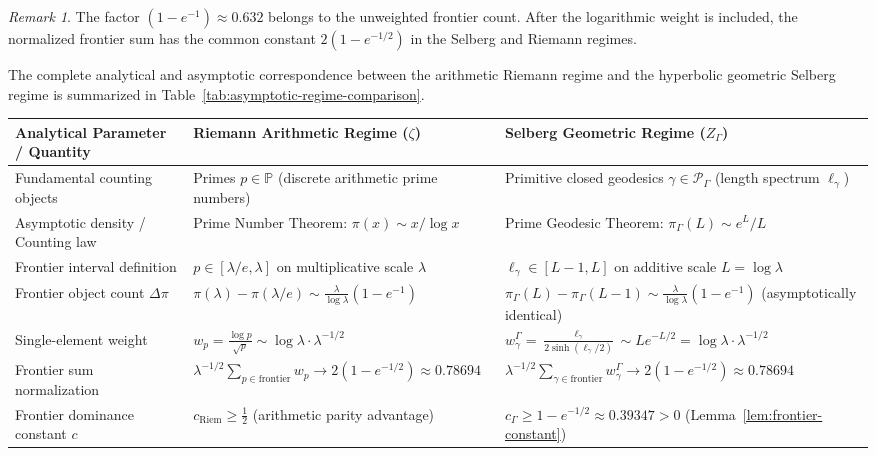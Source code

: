 \documentclass[12pt,a4paper]{article}
\theoremstyle{definition}
\theoremstyle{remark}
\newtheorem{remark}[theorem]{Remark}
\newcommand{\Sel}{Z_{\Gamma}}
\begin{document}
\begin{remark}
The factor $(1-e^{-1}) \approx 0.632$ belongs to the unweighted frontier
count.  After the logarithmic weight is included, the normalized frontier sum
has the common constant $2(1-e^{-1/2})$ in the Selberg and Riemann regimes.
\end{remark}

The complete analytical and asymptotic correspondence between the arithmetic
Riemann regime and the hyperbolic geometric Selberg regime is summarized in
Table~\ref{tab:asymptotic-regime-comparison}.

\begin{table}[htbp]
\centering
\footnotesize
\setlength{\tabcolsep}{4pt}
{\renewcommand{\arraystretch}{1.15}
\begin{tabularx}{\textwidth}{@{}L{3.2cm}YY@{}}
\toprule
\textbf{Analytical Parameter / Quantity} & \textbf{Riemann Arithmetic Regime ($\zeta$)} & \textbf{Selberg Geometric Regime ($\Sel$)} \\
\midrule
Fundamental counting objects
  & Primes $p \in \mathbb{P}$ (discrete arithmetic prime numbers)
  & Primitive closed geodesics $\gamma \in \mathcal{P}_\Gamma$ (length spectrum $\ell_\gamma$) \\[3pt]
Asymptotic density / Counting law
  & Prime Number Theorem: $\pi(x) \sim x / \log x$
  & Prime Geodesic Theorem: $\pi_\Gamma(L) \sim e^L / L$ \\[3pt]
Frontier interval definition
  & $p \in [\lambda/e, \lambda]$ on multiplicative scale $\lambda$
  & $\ell_\gamma \in [L-1, L]$ on additive scale $L = \log\lambda$ \\[3pt]
Frontier object count $\Delta \pi$
  & $\pi(\lambda) - \pi(\lambda/e) \sim \frac{\lambda}{\log\lambda}(1 - e^{-1})$
  & $\pi_\Gamma(L) - \pi_\Gamma(L-1) \sim \frac{\lambda}{\log\lambda}(1 - e^{-1})$ (asymptotically identical) \\[3pt]
Single-element weight
  & $w_p = \frac{\log p}{\sqrt{p}} \sim \log\lambda \cdot \lambda^{-1/2}$
  & $w^\Gamma_\gamma = \frac{\ell_\gamma}{2\sinh(\ell_\gamma/2)} \sim L e^{-L/2} = \log\lambda \cdot \lambda^{-1/2}$ \\[3pt]
Frontier sum normalization
  & $\lambda^{-1/2}\sum_{p \in \mathrm{frontier}} w_p \to 2(1-e^{-1/2}) \approx 0.78694$
  & $\lambda^{-1/2}\sum_{\gamma \in \mathrm{frontier}} w^\Gamma_\gamma \to 2(1-e^{-1/2}) \approx 0.78694$ \\[3pt]
Frontier dominance constant $c$
  & $c_{\mathrm{Riem}} \ge \tfrac{1}{2}$ (arithmetic parity advantage)
  & $c_\Gamma \ge 1 - e^{-1/2} \approx 0.39347 > 0$ (Lemma~\ref{lem:frontier-constant}) \\[3pt]

\end{tabularx}}
\end{table}
\end{document}
